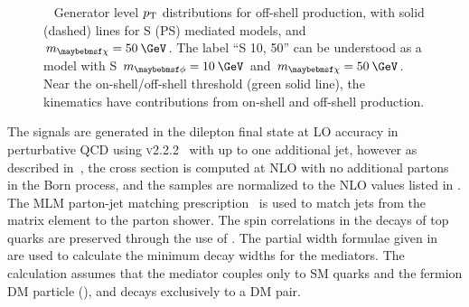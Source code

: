 \begin{figure}[htbp!]
\begin{center}
  \caption{~\protect{} Generator level $p_{\mathrm{T}}$ distributions for off-shell production, with solid  (dashed) lines for S (PS) mediated models, and $\mDM=50\:\GeV$. The label ``S 10, 50'' can be understood as a model with S $\mMed=10\:\GeV$ and $\mDM=50\:\GeV$. \protect{} Near the on-shell/off-shell threshold (green solid line), the kinematics have contributions from on-shell and off-shell production.}
  \label{fig:dmf_medpt2}
\end{center}
\end{figure}

The \ttDM signals are generated in the dilepton final state at LO accuracy in perturbative QCD using \AMCATNLO \textsc{v2.2.2}~\cite{Alwall:2014hca} with up to one additional jet, however as described in~\cite{Backovic:2015soa}, the cross section is computed at NLO with no additional partons in the Born process, and the samples are normalized to the NLO values listed in . The MLM parton-jet matching prescription~\cite{Mangano:2006rw} is used to match jets from the matrix element to the parton shower. The spin correlations in the decays of top quarks are preserved through the use of \MadSpin. The partial width formulae given in ~\cite{PhysRevD.91.055009} are used to calculate the minimum decay widths for the mediators. The calculation assumes that the mediator couples only to SM quarks and the fermion DM particle (\chi), and decays exclusively to a DM pair.  

